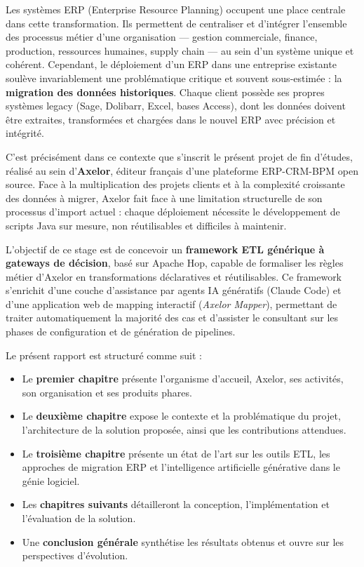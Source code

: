\documentclass[a4paper,12pt]{article}
\begin{document}
Les systèmes ERP (Enterprise Resource Planning) occupent une place centrale dans cette transformation. Ils permettent de centraliser et d'intégrer l'ensemble des processus métier d'une organisation — gestion commerciale, finance, production, ressources humaines, supply chain — au sein d'un système unique et cohérent. Cependant, le déploiement d'un ERP dans une entreprise existante soulève invariablement une problématique critique et souvent sous-estimée : la \textbf{migration des données historiques}. Chaque client possède ses propres systèmes legacy (Sage, Dolibarr, Excel, bases Access), dont les données doivent être extraites, transformées et chargées dans le nouvel ERP avec précision et intégrité.

C'est précisément dans ce contexte que s'inscrit le présent projet de fin d'études, réalisé au sein d'\textbf{Axelor}, éditeur français d'une plateforme ERP-CRM-BPM open source. Face à la multiplication des projets clients et à la complexité croissante des données à migrer, Axelor fait face à une limitation structurelle de son processus d'import actuel : chaque déploiement nécessite le développement de scripts Java sur mesure, non réutilisables et difficiles à maintenir.

L'objectif de ce stage est de concevoir un \textbf{framework ETL générique à gateways de décision}, basé sur Apache Hop, capable de formaliser les règles métier d'Axelor en transformations déclaratives et réutilisables. Ce framework s'enrichit d'une couche d'assistance par agents IA génératifs (Claude Code) et d'une application web de mapping interactif (\textit{Axelor Mapper}), permettant de traiter automatiquement la majorité des cas et d'assister le consultant sur les phases de configuration et de génération de pipelines.

\medskip
Le présent rapport est structuré comme suit :

\begin{itemize}
  \item Le \textbf{premier chapitre} présente l'organisme d'accueil, Axelor, ses activités, son organisation et ses produits phares.
  \item Le \textbf{deuxième chapitre} expose le contexte et la problématique du projet, l'architecture de la solution proposée, ainsi que les contributions attendues.
  \item Le \textbf{troisième chapitre} présente un état de l'art sur les outils ETL, les approches de migration ERP et l'intelligence artificielle générative dans le génie logiciel.
  \item Les \textbf{chapitres suivants} détailleront la conception, l'implémentation et l'évaluation de la solution.
  \item Une \textbf{conclusion générale} synthétise les résultats obtenus et ouvre sur les perspectives d'évolution.
\end{itemize}
\end{document}
